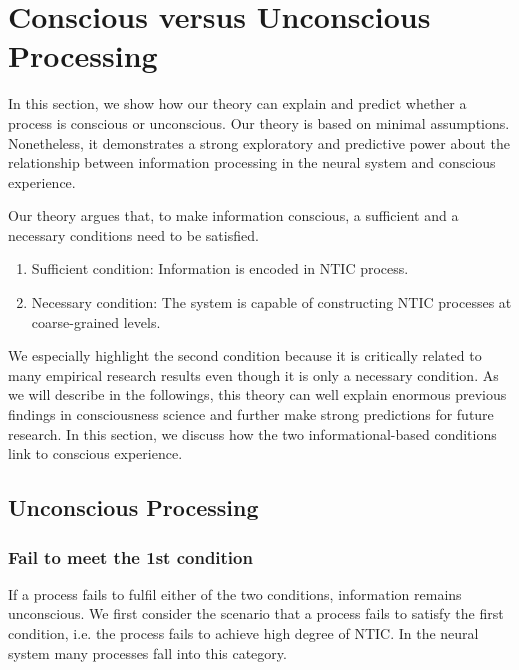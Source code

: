 \documentclass[utf8]{article}
\begin{document}
	\section{Conscious versus Unconscious Processing}\label{sec:Conscious versus Unconscious Processing}
	    In this section, we show how our theory can explain and predict whether a process is conscious or unconscious. Our theory is based on minimal assumptions. Nonetheless, it demonstrates a strong exploratory and predictive power about the relationship between information processing in the neural system and conscious experience.
	    
		Our theory argues that, to make information conscious, a sufficient and a necessary conditions need to be satisfied.
		
		\begin{enumerate}
		    \item Sufficient condition: Information is encoded in NTIC process. 
		    \item Necessary condition: The system is capable of constructing NTIC processes at coarse-grained levels. 
		\end{enumerate}		
		
        We especially highlight the second condition because it is critically related to many empirical research results even though it is only a necessary condition. As we will describe in the followings, this theory can well explain enormous previous findings in consciousness science and further make strong predictions for future research. In this section, we discuss how the two informational-based conditions link to conscious experience. 
		
		
		
        \subsection{Unconscious Processing}
        
        \subsubsection*{Fail to meet the 1\lowercase{st} condition}
            If a process fails to fulfil either of the two conditions, information remains unconscious. We first consider the scenario that a process fails to satisfy the first condition, i.e. the process fails to achieve high degree of NTIC. In the neural system many processes fall into this category. 
        	
\end{document}
